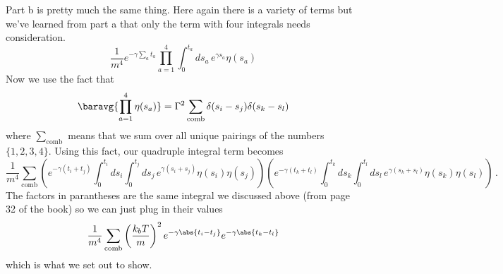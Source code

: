 Part b is pretty much the same thing. Here again there is a variety of terms but we've learned from part a that only the term with four integrals needs consideration.
\begin{equation*}
    \frac{1}{m^4} e^{-\gamma \sum_a t_a} \prod_{a=1}^4 \int_0^{t_a} ds_a \, e^{\gamma s_a} \eta(s_a)
\end{equation*}
Now we use the fact that
\begin{equation*}
  \baravg{\prod_{a=1}^4 \eta(s_a)} = \Gamma^2 \sum_\text{comb} \delta(s_i - s_j)\delta(s_k - s_l)
\end{equation*}
where $\sum_\text{comb}$ means that we sum over all unique pairings of the numbers $\{1, 2, 3, 4\}$.
Using this fact, our quadruple integral term becomes
\begin{equation*}
  \frac{1}{m^4} \sum_\text{comb}
  \left( e^{-\gamma (t_i + t_j)}\int_0^{t_i} ds_i \int_0^{t_j} ds_j \, e^{\gamma ( s_i + s_j )} \eta(s_i) \eta(s_j) \right)
  \left( e^{-\gamma (t_k + t_l)}\int_0^{t_k} ds_k \int_0^{t_l} ds_l \, e^{\gamma ( s_k + s_l )} \eta(s_k) \eta(s_l) \right)
  \, .
\end{equation*}
The factors in parantheses are the same integral we discussed above (from page 32 of the book) so we can just plug in their values
\begin{equation*}
  \frac{1}{m^4} \sum_\text{comb}
  \left( \frac{k_b T}{m} \right)^2 e^{-\gamma \abs{t_i - t_j}} e^{-\gamma \abs{t_k - t_l}}
\end{equation*}
which is what we set out to show.
